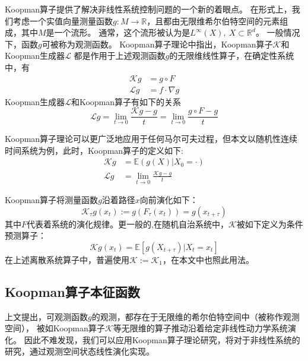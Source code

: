 \documentclass[AutoFakeBold]{LZUThesis}
\begin{document}
Koopman算子提供了解决非线性系统控制问题的一个新的着眼点。
在形式上，我们考虑一个实值向量测量函数$g: M \to \mathbb{R}$，且都由无限维希尔伯特空间的元素组成，其中$M$是一个流形。
通常，这个流形被认为是$L^\infty(X), \ X \subset \mathbb{R}^d$。
一般情况下，函数$g$可被称为观测函数。
Koopman算子理论中指出，Koopman算子$\mathcal{K}$和Koopman生成器$\mathcal{L}$
都是作用于上述观测函数$g$的无限维线性算子，在确定性系统中，有
\begin{subequations}
  \begin{align}
    \mathcal{K}g &= g \circ F \\
    \mathcal{L}g &= f \cdot \nabla g
  \end{align}
\end{subequations}
Koopman生成器$\mathcal{L}$和Koopman算子有如下的关系
\begin{equation}
  \mathcal{L} g = \lim_{t \to 0} \frac{\mathcal{K}g - g}{t} = \lim_{t \to 0} \frac{g \circ F - g}{t}
\end{equation}

Koopman算子理论可以更广泛地应用于任何马尔可夫过程，但本文以随机性连续时间系统为例，此时，Koopman算子的定义如下:
\begin{align*}
  \mathcal{K} g &= \mathbb{E} (g(X) | X_0 = \cdot) \\
  \mathcal{L} g &= \lim_{t \to 0} \frac{\mathcal{K} g - g}{t}
\end{align*}

Koopman算子将测量函数$g$沿着路径$x$向前演化如下：
\begin{equation}
  \mathcal{K}_\tau g(x_t) := g(F_\tau(x_t)) = g(x_{t + \tau})
\end{equation}
其中$F$代表着系统的演化规律。更一般的,在随机自治系统中，$\mathcal{K}$被如下定义为条件预测算子：
\begin{equation}
  \mathcal{K} g(x_t) = \mathbb{E}\left[g(X_{t + \tau}) | X_t = x_t\right]
  \label{Linear_Predictor_K}
\end{equation}
在上述离散系统算子中，普遍使用$\mathcal{K} := \mathcal{K}_1$，在本文中也照此用法。


\subsection{Koopman算子本征函数}
上文提出，可观测函数$g$的观测，都存在于无限维的希尔伯特空间中（被称作观测空间），
被如Koopman算子$\mathcal{K}$等无限维的算子推动沿着给定非线性动力学系统演化。
因此不难发现，我们可以应用Koopman算子理论研究，将对于非线性系统的研究，通过观测空间状态线性演化实现。
\end{document}
